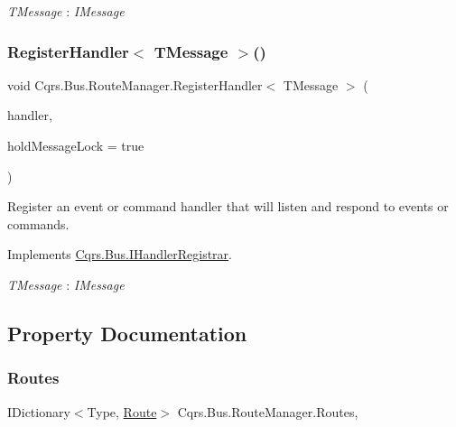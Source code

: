 \begin{Desc}
\item[Type Constraints]\begin{description}
\item[{\em T\+Message} : {\em I\+Message}]\end{description}
\end{Desc}
\mbox{\label{classCqrs_1_1Bus_1_1RouteManager_aeb620222dd0351a6d3848caf93e29954}} 
\subsubsection{\texorpdfstring{Register\+Handler$<$ T\+Message $>$()}{RegisterHandler< TMessage >()}\hspace{0.1cm}{\footnotesize\ttfamily [2/2]}}
{\footnotesize\ttfamily void Cqrs.\+Bus.\+Route\+Manager.\+Register\+Handler$<$ T\+Message $>$ (\begin{DoxyParamCaption}\item[{Action$<$ T\+Message $>$}]{handler,  }\item[{bool}]{hold\+Message\+Lock = {\ttfamily true} }\end{DoxyParamCaption})}



Register an event or command handler that will listen and respond to events or commands. 



Implements \hyperlink{interfaceCqrs_1_1Bus_1_1IHandlerRegistrar_a07792dcc9a8b272709ff2e2dd336a642}{Cqrs.\+Bus.\+I\+Handler\+Registrar}.

\begin{Desc}
\item[Type Constraints]\begin{description}
\item[{\em T\+Message} : {\em I\+Message}]\end{description}
\end{Desc}


\subsection{Property Documentation}
\mbox{\label{classCqrs_1_1Bus_1_1RouteManager_ad6a3c8e41e10f62d075e52d08d817cee}} 
\subsubsection{\texorpdfstring{Routes}{Routes}}
{\footnotesize\ttfamily I\+Dictionary$<$Type, \hyperlink{classCqrs_1_1Bus_1_1Route}{Route}$>$ Cqrs.\+Bus.\+Route\+Manager.\+Routes\hspace{0.3cm}{\ttfamily [get]}, {\ttfamily [protected]}}

